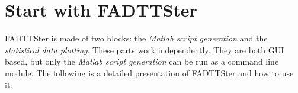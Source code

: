 \documentclass[fadttsterUserGuide_master]{subfiles}
\begin{document}
	\part{Start with FADTTSter}
	
	FADTTSter is made of two blocks: the \emph{Matlab script generation} and the \emph{statistical data plotting}. These parts work independently. They are both GUI based, but only the \emph{Matlab script generation} can be run as a command line module.
The following is a detailed presentation of FADTTSter and how to use it.
	
		
	
\end{document}
